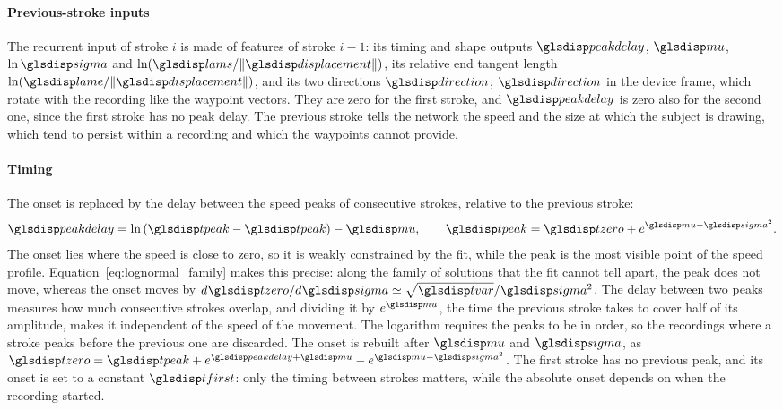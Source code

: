 \documentclass[12pt]{report}
\begin{document}
\paragraph{Previous-stroke inputs}
The recurrent input of stroke $i$ is made of features of stroke $i-1$: its timing and shape outputs $\sym{peakdelay}_{i-1}$, $\sym{mu}_{i-1}$, $\ln\sym{sigma}_{i-1}$ and $\ln(\sym{lams}_{i-1}/\lVert\sym{displacement}_{i-1}\rVert)$, its relative end tangent length $\ln(\sym{lame}_{i-1}/\lVert\sym{displacement}_{i-1}\rVert)$, and its two directions $\sym{direction}_{i-1}$, $\sym{direction}_i$ in the device frame, which rotate with the recording like the waypoint vectors. They are zero for the first stroke, and $\sym{peakdelay}_{i-1}$ is zero also for the second one, since the first stroke has no peak delay. The previous stroke tells the network the speed and the size at which the subject is drawing, which tend to persist within a recording and which the waypoints cannot provide.

\paragraph{Timing}
The onset is replaced by the delay between the speed peaks of consecutive strokes, relative to the previous stroke:
\begin{equation}
    \sym{peakdelay}_i=\ln\left(\sym{tpeak}_i-\sym{tpeak}_{i-1}\right)-\sym{mu}_{i-1},\qquad
    \sym{tpeak}_i=\sym{tzero}_i+e^{\sym{mu}_i-\sym{sigma}_i^2}.
    \label{eq:peak_delay}
\end{equation}
The onset lies where the speed is close to zero, so it is weakly constrained by the fit, while the peak is the most visible point of the speed profile. Equation~\eqref{eq:lognormal_family} makes this precise: along the family of solutions that the fit cannot tell apart, the peak does not move, whereas the onset moves by $d\sym{tzero}/d\sym{sigma}\simeq\sqrt{\sym{tvar}_i}/\sym{sigma}^2$. The delay between two peaks measures how much consecutive strokes overlap, and dividing it by $e^{\sym{mu}_{i-1}}$, the time the previous stroke takes to cover half of its amplitude, makes it independent of the speed of the movement. The logarithm requires the peaks to be in order, so the recordings where a stroke peaks before the previous one are discarded. The onset is rebuilt after $\sym{mu}_i$ and $\sym{sigma}_i$, as $\sym{tzero}_i=\sym{tpeak}_{i-1}+e^{\sym{peakdelay}_i+\sym{mu}_{i-1}}-e^{\sym{mu}_i-\sym{sigma}_i^2}$. The first stroke has no previous peak, and its onset is set to a constant $\sym{tfirst}$: only the timing between strokes matters, while the absolute onset depends on when the recording started.
\end{document}
